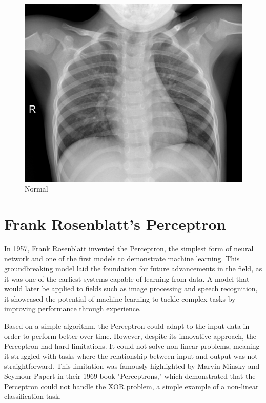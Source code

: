 \documentclass{article}
\begin{document}
\begin{figure}[!htb]
  \includegraphics[width=\linewidth]{assets/intro/scan-normal.jpeg}
  \caption{Normal}\label{fig:scan-normal}
\endminipage
\end{figure}

\section{Frank Rosenblatt's Perceptron}

In 1957, Frank Rosenblatt invented the Perceptron, the simplest form of neural network and one of the first models to demonstrate machine learning. This groundbreaking model laid the foundation for future advancements in the field, as it was one of the earliest systems capable of learning from data. A model that would later be applied to fields such as image processing and speech recognition, it showcased the potential of machine learning to tackle complex tasks by improving performance through experience.

Based on a simple algorithm, the Perceptron could adapt to the input data in order to perform better over time. However, despite its innovative approach, the Perceptron had hard limitations. It could not solve non-linear problems, meaning it struggled with tasks where the relationship between input and output was not straightforward. This limitation was famously highlighted by Marvin Minsky and Seymour Papert in their 1969 book "Perceptrons," which demonstrated that the Perceptron could not handle the XOR problem, a simple example of a non-linear classification task.
\end{document}
